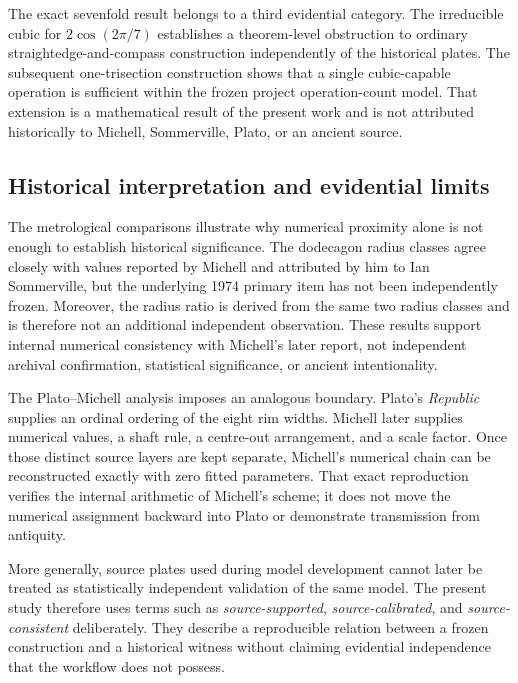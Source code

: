 \documentclass[11pt]{article}
\begin{document}
The exact sevenfold result belongs to a third evidential category.  The
irreducible cubic for $2\cos(2\pi/7)$ establishes a theorem-level obstruction
to ordinary straightedge-and-compass construction independently of the
historical plates.  The subsequent one-trisection construction shows that a
single cubic-capable operation is sufficient within the frozen project
operation-count model.  That extension is a mathematical result of the
present work and is not attributed historically to Michell, Sommerville,
Plato, or an ancient source.

\subsection{Historical interpretation and evidential limits}

The metrological comparisons illustrate why numerical proximity alone is not
enough to establish historical significance.  The dodecagon radius classes
agree closely with values reported by Michell and attributed by him to Ian
Sommerville, but the underlying 1974 primary item has not been independently
frozen.  Moreover, the radius ratio is derived from the same two radius
classes and is therefore not an additional independent observation.  These
results support internal numerical consistency with Michell's later report,
not independent archival confirmation, statistical significance, or ancient
intentionality.

The Plato--Michell analysis imposes an analogous boundary.  Plato's
\emph{Republic} supplies an ordinal ordering of the eight rim widths.
Michell later supplies numerical values, a shaft rule, a centre-out
arrangement, and a scale factor.  Once those distinct source layers are kept
separate, Michell's numerical chain can be reconstructed exactly with zero
fitted parameters.  That exact reproduction verifies the internal arithmetic
of Michell's scheme; it does not move the numerical assignment backward into
Plato or demonstrate transmission from antiquity.

More generally, source plates used during model development cannot later be
treated as statistically independent validation of the same model.  The
present study therefore uses terms such as \emph{source-supported},
\emph{source-calibrated}, and \emph{source-consistent} deliberately.  They
describe a reproducible relation between a frozen construction and a historical
witness without claiming evidential independence that the workflow does not
possess.
\end{document}
